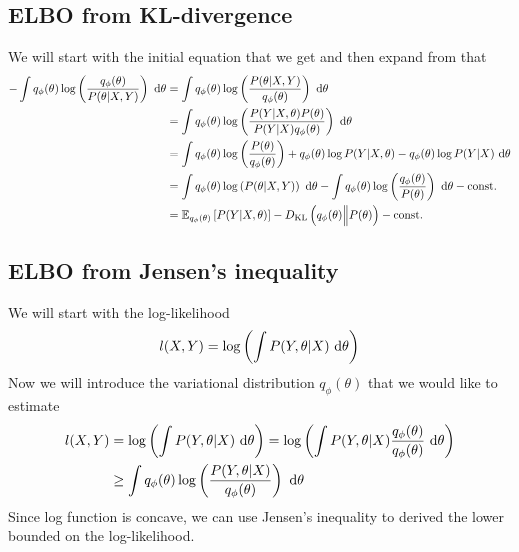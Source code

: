 \subsection{ELBO from KL-divergence}
\label{appx:chap2-elbo-kl}
We will start with the initial equation that we get and then expand from that 
\begin{equation*}
    \begin{aligned}
        -\int q_{\phi} (\theta) \log\left( \frac{q_{\phi} (\theta)}{P(\theta | X, Y)} \right) \ \mathrm{d} \theta &= \int q_{\phi} (\theta) \log\left( \frac{P(\theta | X, Y)}{q_{\phi} (\theta)} \right) \ \mathrm{d} \theta \\ 
        &= \int q_{\phi} (\theta) \log\left( \frac{P(Y | X, \theta) P(\theta)}{P(Y|X)q_{\phi} (\theta)} \right) \ \mathrm{d} \theta \\
        &= \int q_{\phi} (\theta) \log \left( \frac{P(\theta)}{q_{\phi} (\theta)} \right) + q_{\phi} (\theta) \log P(Y | X, \theta) - q_{\phi} (\theta) \log P(Y| X) \ \mathrm{d} \theta \\
        &= \int q_{\phi} (\theta) \log\left( P(\theta | X, Y) \right) \ \mathrm{d} \theta - \int q_{\phi} (\theta) \log\left( \frac{q_{\phi} (\theta)}{P(\theta)} \right) \ \mathrm{d} \theta  - \text{const.} \\
        &= \mathbb{E}_{q_{\phi} (\theta)} \left[ P(Y | X, \theta) \right] - D_{\mathrm{KL}} \left(q_{\phi} (\theta) \Big\| P(\theta) \right) - \text{const.} \\
    \end{aligned}
\end{equation*}


\subsection{ELBO from Jensen's inequality}
\label{appx:chap2-elbo-jensen}
We will start with the log-likelihood 
\begin{equation}
    l(X, Y) = \log \left( \int P(Y,  \theta | X) \ \mathrm{d} \theta \right)
\end{equation}
Now we will introduce the variational distribution $q_{\phi}(\theta)$ that we would like to estimate
\begin{equation*}
    \begin{aligned}
        l(X, Y) &= \log \left( \int P(Y,  \theta | X) \ \mathrm{d} \theta \right) = \log \left( \int P(Y,  \theta | X) \frac{q_{\phi}(\theta)}{q_{\phi}(\theta)} \ \mathrm{d} \theta \right) \\
        &\ge \int  q_{\phi}(\theta) \log\left(\frac{P(Y,  \theta | X)}{q_{\phi}(\theta)}\right) \ \mathrm{d} \theta
    \end{aligned}
\end{equation*}
Since log function is concave, we can use Jensen's inequality to derived the lower bounded on the log-likelihood.



